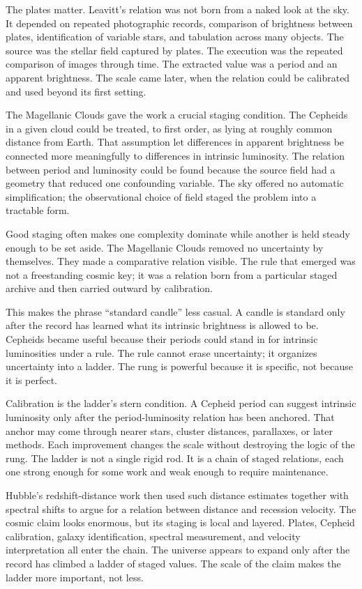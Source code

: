 The plates matter. Leavitt's relation was not born from a naked look at the
sky. It depended on repeated photographic records, comparison of brightness
between plates, identification of variable stars, and tabulation across
many objects. The source was the stellar field captured by plates. The
execution was the repeated comparison of images through time. The extracted
value was a period and an apparent brightness. The scale came later, when
the relation could be calibrated and used beyond its first setting.

The Magellanic Clouds gave the work a crucial staging condition. The
Cepheids in a given cloud could be treated, to first order, as lying at
roughly common distance from Earth. That assumption let differences in
apparent brightness be connected more meaningfully to differences in
intrinsic luminosity. The relation between period and luminosity could be
found because the source field had a geometry that reduced one confounding
variable. The sky offered no automatic simplification; the observational
choice of field staged the problem into a tractable form.

Good staging often makes one complexity dominate while another is held
steady enough to be set aside. The Magellanic Clouds removed no uncertainty
by themselves. They made a comparative relation visible. The rule that
emerged was not a freestanding cosmic key; it was a relation born from a
particular staged archive and then carried outward by calibration.

This makes the phrase ``standard candle'' less casual. A candle is standard
only after the record has learned what its intrinsic brightness is allowed
to be. Cepheids became useful because their periods could stand in for
intrinsic luminosities under a rule. The rule cannot erase uncertainty; it
organizes uncertainty into a ladder. The rung is powerful because it is
specific, not because it is perfect.

Calibration is the ladder's stern condition. A Cepheid period can suggest
intrinsic luminosity only after the period-luminosity relation has been
anchored. That anchor may come through nearer stars, cluster distances,
parallaxes, or later methods. Each improvement changes the scale without
destroying the logic of the rung. The ladder is not a single rigid rod. It
is a chain of staged relations, each one strong enough for some work and
weak enough to require maintenance.

Hubble's redshift-distance work then used such distance estimates together
with spectral shifts to argue for a relation between distance and recession
velocity. The cosmic claim looks enormous, but its staging is local and
layered. Plates, Cepheid calibration, galaxy identification, spectral
measurement, and velocity interpretation all enter the chain. The universe
appears to expand only after the record has climbed a ladder of staged
values. The scale of the claim makes the ladder more important, not less.


